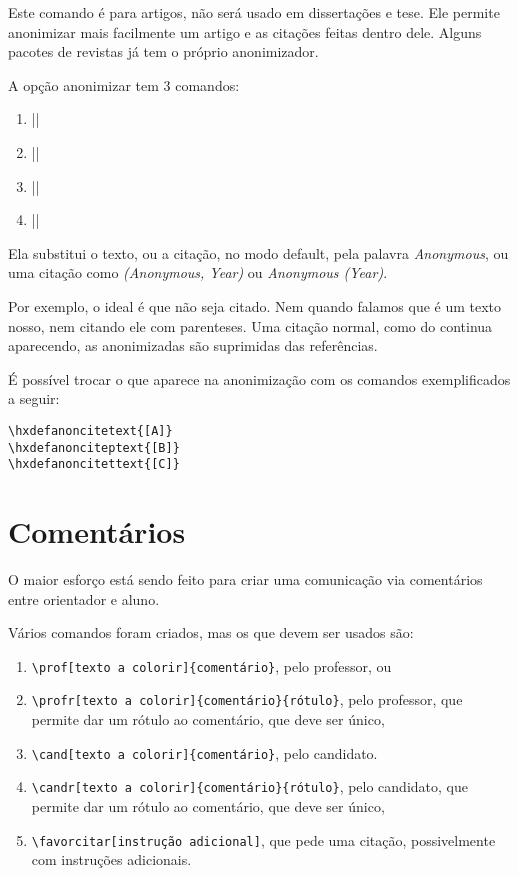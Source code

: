 \documentclass{article}
\begin{document}
    Este comando é para artigos, não será usado em dissertações e tese. Ele permite anonimizar mais facilmente um artigo e as citações feitas dentro dele. Alguns pacotes de revistas já tem o próprio anonimizador.
    
    A opção anonimizar tem 3 comandos:
    \begin{enumerate}
        \item ||
        \item ||
        \item ||
        \item ||
    \end{enumerate}
    
    Ela substitui o texto, ou a citação, no modo default, pela palavra \textit{Anonymous}, ou uma citação como \textit{(Anonymous, Year)} ou \textit{Anonymous (Year)}.
    
    Por exemplo, o ideal é que  não seja citado. Nem quando falamos que  é um texto nosso, nem citando ele com parenteses. Uma citação normal, como do \citet{Juran2010} continua aparecendo, as anonimizadas são suprimidas das referências.
    
    É possível trocar o que aparece na anonimização com os comandos exemplificados a seguir:
    \begin{verbatim}
\hxdefanoncitetext{[A]}
\hxdefanonciteptext{[B]}
\hxdefanoncitettext{[C]}
    \end{verbatim}
    
    \section{Comentários}
 \label{sec:com}   
    O maior esforço está sendo feito para criar uma comunicação via comentários entre orientador e aluno.
    
    Vários comandos foram criados, mas os que devem ser usados são:
    \begin{enumerate}
        \item \verb!\prof[texto a colorir]{comentário}!, pelo professor, ou
        \item \verb!\profr[texto a colorir]{comentário}{rótulo}!, pelo professor, que permite dar um rótulo ao comentário, que deve ser único,
        \item \verb!\cand[texto a colorir]{comentário}!, pelo candidato.
        \item \verb!\candr[texto a colorir]{comentário}{rótulo}!, pelo candidato, que permite dar um rótulo ao comentário, que deve ser único,
        \item \verb!\favorcitar[instrução adicional]!, que pede uma citação, possivelmente com instruções adicionais.
    \end{enumerate}
    
\end{document}
